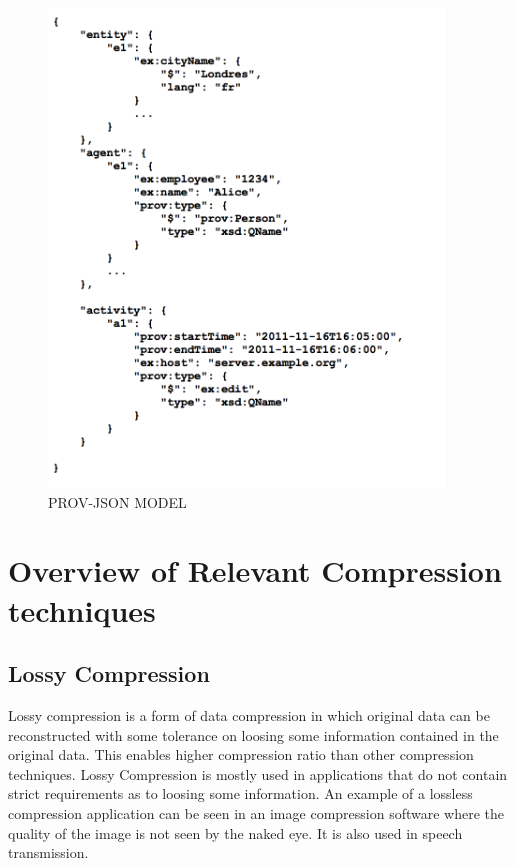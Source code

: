 \begin{figure}[h]
\begin{center}

\includegraphics[height=5in]{prov_json.png}
\end{center}
\caption{PROV-JSON MODEL}

\end{figure}



\section{Overview of Relevant Compression techniques}

\subsection{Lossy Compression}

Lossy compression \cite{Sayood:2000:IDC:336428} is a form of data compression in which original data can be reconstructed with some tolerance on loosing some information contained in the original data. This enables higher compression ratio than other compression techniques. Lossy Compression is mostly used in applications that do not contain strict requirements as to loosing some information. An example of a lossless compression application can be seen in an image compression software where the quality of the image is not seen by the naked eye. It is also used in speech transmission. 

